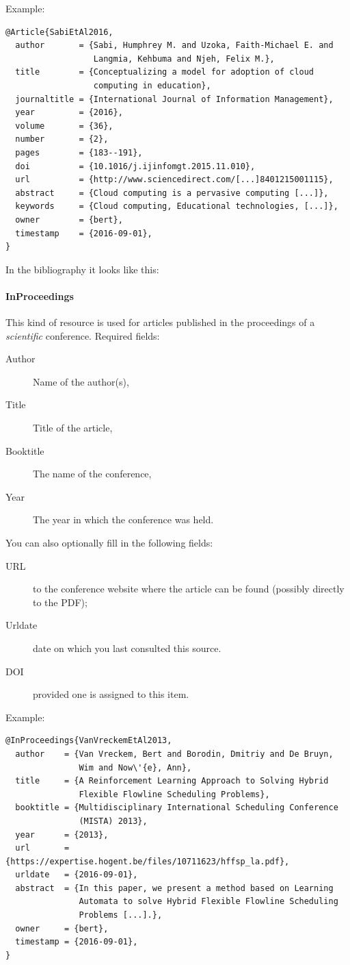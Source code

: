 Example:
\begin{verbatim}
@Article{SabiEtAl2016,
  author       = {Sabi, Humphrey M. and Uzoka, Faith-Michael E. and
                  Langmia, Kehbuma and Njeh, Felix M.},
  title        = {Conceptualizing a model for adoption of cloud
                  computing in education},
  journaltitle = {International Journal of Information Management},
  year         = {2016},
  volume       = {36},
  number       = {2},
  pages        = {183--191},
  doi          = {10.1016/j.ijinfomgt.2015.11.010},
  url          = {http://www.sciencedirect.com/[...]8401215001115},
  abstract     = {Cloud computing is a pervasive computing [...]},
  keywords     = {Cloud computing, Educational technologies, [...]},
  owner        = {bert},
  timestamp    = {2016-09-01},
}
\end{verbatim}

In the bibliography it looks like this: 

\paragraph{InProceedings}

This kind of resource is used for articles published in the proceedings of a \emph{scientific} conference. Required fields:

\begin{description}
  \item[Author] Name of the author(s),
  \item[Title] Title of the article,
  \item[Booktitle] The name of the conference,
  \item[Year] The year in which the conference was held.
\end{description}

You can also optionally fill in the following fields:

\begin{description}
  \item[URL] to the conference website where the article can be found (possibly directly to the PDF);
  \item[Urldate] date on which you last consulted this source.
  \item[DOI] provided one is assigned to this item.
\end{description}

Example:
\begin{verbatim}
@InProceedings{VanVreckemEtAl2013,
  author    = {Van Vreckem, Bert and Borodin, Dmitriy and De Bruyn,
               Wim and Now\'{e}, Ann},
  title     = {A Reinforcement Learning Approach to Solving Hybrid
               Flexible Flowline Scheduling Problems},
  booktitle = {Multidisciplinary International Scheduling Conference
               (MISTA) 2013},
  year      = {2013},
  url       = {https://expertise.hogent.be/files/10711623/hffsp_la.pdf},
  urldate   = {2016-09-01},
  abstract  = {In this paper, we present a method based on Learning
               Automata to solve Hybrid Flexible Flowline Scheduling 
               Problems [...].},
  owner     = {bert},
  timestamp = {2016-09-01},
}
\end{verbatim}

